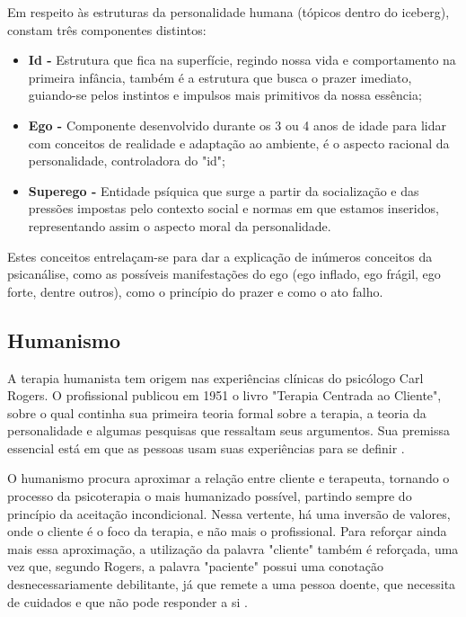 Em respeito às estruturas da personalidade humana (tópicos dentro do iceberg), constam três componentes distintos:
\begin{itemize}
    \item \textbf{Id -} Estrutura que fica na superfície, regindo nossa vida e comportamento na primeira infância, também é a estrutura que busca o prazer imediato, guiando-se pelos instintos e impulsos mais primitivos da nossa essência;
    \item \textbf{Ego -} Componente desenvolvido durante os 3 ou 4 anos de idade para lidar com conceitos de realidade e adaptação ao ambiente, é o aspecto racional da personalidade, controladora do "id";
    \item \textbf{Superego - } Entidade psíquica que surge a partir da socialização e das pressões impostas pelo contexto social e normas em que estamos inseridos, representando assim o aspecto moral da personalidade. 
\end{itemize}

Estes conceitos entrelaçam-se para dar a explicação de inúmeros conceitos da psicanálise, como as possíveis manifestações do ego (ego inflado, ego frágil, ego forte, dentre outros), como o princípio do prazer e como o ato falho.

\subsection{Humanismo}
\label{sec:Humanismo}
A terapia humanista tem origem nas experiências clínicas do psicólogo Carl Rogers. O profissional publicou em 1951 o livro "Terapia Centrada ao Cliente", sobre o qual continha sua primeira teoria formal sobre a terapia, a teoria da personalidade e algumas pesquisas que ressaltam seus argumentos. Sua premissa essencial está em que as pessoas usam suas experiências para se definir \cite{Barros2022}.

O humanismo procura aproximar a relação entre cliente e terapeuta, tornando o processo da psicoterapia o mais humanizado possível, partindo sempre do princípio da aceitação incondicional. Nessa vertente, há uma inversão de valores, onde o cliente é o foco da terapia, e não mais o profissional. Para reforçar ainda mais essa aproximação, a utilização da palavra "cliente" também é reforçada, uma vez que, segundo Rogers, a palavra "paciente" possui uma conotação desnecessariamente debilitante, já que remete a uma pessoa doente, que necessita de cuidados e que não pode responder a si \cite{Barros2022}.

